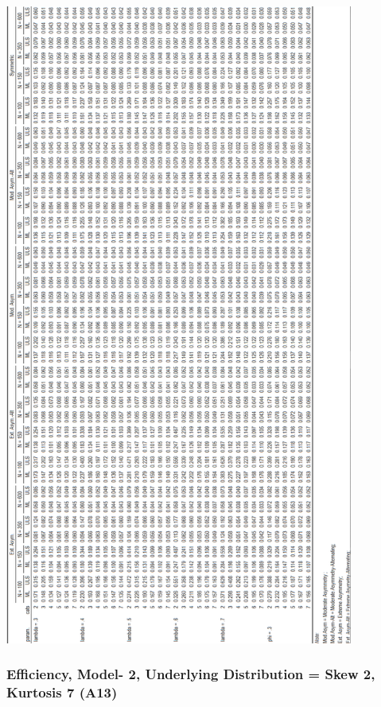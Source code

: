 \documentclass[10,a4paperpaper,]{article}
\begin{document}
\includegraphics[width=325pt]{./figures/tabA12}

\subsubsection{Efficiency, Model- 2, Underlying Distribution = Skew 2, Kurtosis 7 (A13)}
\end{document}
